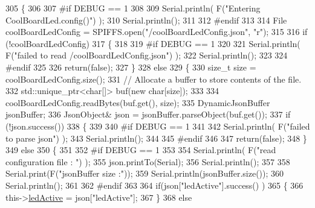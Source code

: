 \begin{DoxyCode}
305 \{
306 
307 \textcolor{preprocessor}{#if DEBUG == 1 }
308         
309     Serial.println( F(\textcolor{stringliteral}{"Entering CoolBoardLed.config()"}) );
310     Serial.println();
311 
312 \textcolor{preprocessor}{#endif}
313     
314     File coolBoardLedConfig = SPIFFS.open(\textcolor{stringliteral}{"/coolBoardLedConfig.json"}, \textcolor{stringliteral}{"r"});
315 
316     \textcolor{keywordflow}{if} (!coolBoardLedConfig) 
317     \{
318     
319 \textcolor{preprocessor}{    #if DEBUG == 1}
320 
321         Serial.println( F(\textcolor{stringliteral}{"failed to read /coolBoardLedConfig.json"}) );
322         Serial.println();
323 
324 \textcolor{preprocessor}{    #endif}
325 
326         \textcolor{keywordflow}{return}(\textcolor{keyword}{false});
327     \}
328     \textcolor{keywordflow}{else}
329     \{
330         \textcolor{keywordtype}{size\_t} size = coolBoardLedConfig.size();
331         \textcolor{comment}{// Allocate a buffer to store contents of the file.}
332         std::unique\_ptr<char[]> buf(\textcolor{keyword}{new} \textcolor{keywordtype}{char}[size]);
333 
334         coolBoardLedConfig.readBytes(buf.get(), size);
335         DynamicJsonBuffer jsonBuffer;
336         JsonObject& json = jsonBuffer.parseObject(buf.get());
337         \textcolor{keywordflow}{if} (!json.success()) 
338         \{
339         
340 \textcolor{preprocessor}{        #if DEBUG == 1}
341 
342             Serial.println( F(\textcolor{stringliteral}{"failed to parse json"}) );
343             Serial.println();
344         
345 \textcolor{preprocessor}{        #endif}
346 
347             \textcolor{keywordflow}{return}(\textcolor{keyword}{false});
348         \} 
349         \textcolor{keywordflow}{else}
350         \{
351         
352 \textcolor{preprocessor}{        #if DEBUG == 1}
353     
354             Serial.println( F(\textcolor{stringliteral}{"read configuration file : "}) );
355             json.printTo(Serial);
356             Serial.println();
357             
358             Serial.print(F(\textcolor{stringliteral}{"jsonBuffer size :"}));
359             Serial.println(jsonBuffer.size());
360             Serial.println();
361 
362 \textcolor{preprocessor}{        #endif}
363   
364             \textcolor{keywordflow}{if}(json[\textcolor{stringliteral}{"ledActive"}].success() )
365             \{
366                 this->\hyperlink{class_cool_board_led_aadd04d2ecf123247718d77f42fba7f08}{ledActive} = json[\textcolor{stringliteral}{"ledActive"}]; 
367             \}
368             \textcolor{keywordflow}{else}

\end{DoxyCode}

